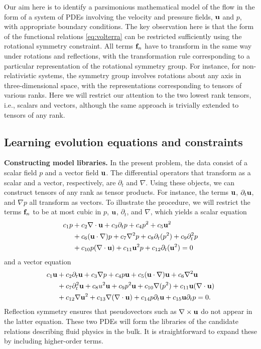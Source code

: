 \documentclass[9pt,twocolumn,twoside,lineno]{pnas-new}
\begin{document}
Our aim here is to identify a parsimonious mathematical model of the flow in the form of a system of PDEs involving the velocity and pressure fields, ${\bf u}$ and $p$, with appropriate boundary conditions. The key observation here is that the form of the functional relations \eqref{eq:volterra} can be restricted sufficiently using the rotational symmetry constraint. All terms ${\bf f}_n$ have to transform in the same way under rotations and reflections, with the transformation rule corresponding to a particular representation of the rotational symmetry group. For instance, for non-relativistic systems, the symmetry group involves rotations about any axis in three-dimensional space, with the representations corresponding to tensors of various ranks. Here we will restrict our attention to the two lowest rank tensors, i.e., scalars and vectors, although the same approach is trivially extended to tensors of any rank.

\subsection*{Learning evolution equations and constraints}
{\bf Constructing model libraries.} In the present problem, the data consist of a scalar field $p$ and a vector field ${\bf u}$. The differential operators that transform as a scalar and a vector, respectively, are $\partial_t$ and $\nabla$. Using these objects, we can construct tensors of any rank as tensor products. For instance, the terms ${\bf u}$, $\partial_t{\bf u}$, and $\nabla p$ all transform as vectors. To illustrate the procedure, we will restrict the terms ${\bf f}_n$ to be at most cubic in $p$, ${\bf u}$, $\partial_t$, and $\nabla$, which yields a scalar equation
\begin{equation}
\begin{aligned}
c_1p&+c_2\nabla\cdot{\bf u}+c_3 \partial_t p+c_4p^2+c_5{\bf u}^2\\
&+c_6({\bf u}\cdot\nabla)p+c_7\nabla^2p+c_8\partial_t(p^2)+c_9\partial^2_tp\\
&+c_{10}p(\nabla\cdot {\bf u})+c_{11}{\bf u}^2p+c_{12}\partial_t({\bf u}^2)=0
\label{eq:rank0}
\end{aligned}
\end{equation}
and a vector equation
\begin{equation}
\begin{aligned}
c_1{\bf u}&+c_2\partial_t{\bf u}+c_3\nabla p+c_4p{\bf u}+c_5({\bf u}\cdot\nabla){\bf u}+c_6\nabla^2{\bf u}\\
&+c_7\partial^2_t{\bf u}+c_8u^2{\bf u}
+c_9p^2{\bf u}+c_{10}\nabla (p^2)+c_{11}{\bf u}(\nabla\cdot{\bf u})\\
&+c_{12}\nabla{\bf u}^2+c_{13}\nabla(\nabla\cdot{\bf u})+c_{14}p \partial_t {\bf u}+c_{15}{\bf u} \partial_t p = 0.
\label{eq:rank1}
\end{aligned}
\end{equation}
Reflection symmetry ensures that pseudovectors such as $\nabla\times{\bf u}$ do not appear in the latter equation.
These two PDEs will form the libraries of the candidate relations describing fluid physics in the bulk. It is straightforward to expand these by including higher-order terms.
\end{document}
